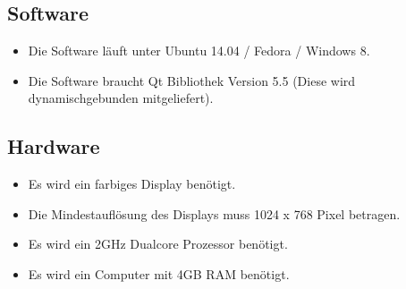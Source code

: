 \subsection{Software}
\begin{itemize}
\item Die Software läuft unter Ubuntu 14.04 / Fedora / Windows 8. 
\item Die Software braucht Qt Bibliothek Version 5.5 (Diese wird dynamischgebunden mitgeliefert).
\end{itemize}
\subsection{Hardware}
\begin{itemize}
\item Es wird ein farbiges Display benötigt. 
\item Die Mindestauflösung des Displays muss 1024 x 768 Pixel betragen.
\item Es wird ein 2GHz Dualcore Prozessor benötigt.
\item Es wird ein Computer mit 4GB RAM benötigt.
\end{itemize}
